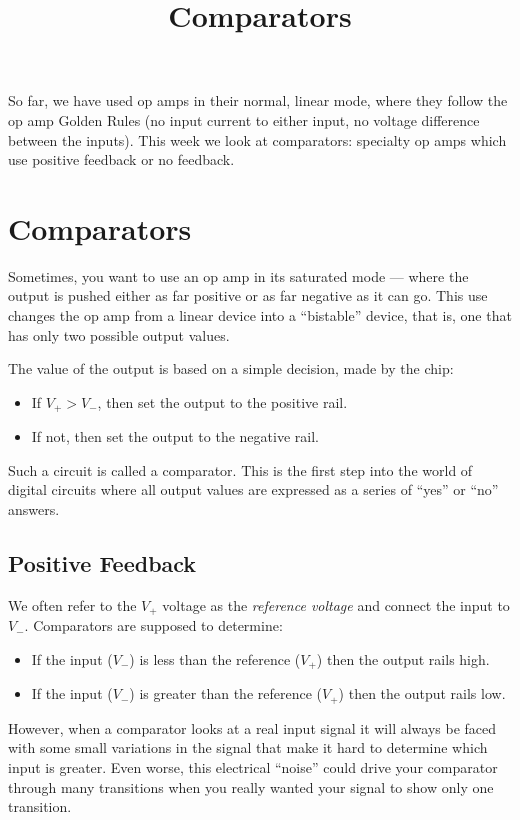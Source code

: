 \documentclass{article}
\title{Comparators}
\begin{document}
\maketitle

So far, we have used op amps in their normal, linear mode, where they follow the op amp Golden Rules (no input current to either input, no voltage difference between the inputs). This week we look at comparators: specialty op amps which use positive feedback or no feedback.

\section{Comparators}
Sometimes, you want to use an op amp in its saturated mode --- where the output is pushed either as far positive or as far negative as it can go. This use changes the op amp from a linear device into a ``bistable'' device, that is, one that has only two possible output values.

The value of the output is based on a simple decision, made by the chip:
\begin{itemize}
\item If $V_+ > V_-$, then set the output to the positive rail.
\item If not, then set the output to the negative rail.
\end{itemize}
Such a circuit is called a comparator. This is the first step into the world of digital circuits where all output values are expressed as a series of ``yes'' or ``no'' answers.

\subsection{Positive Feedback}
We often refer to the $V_+$ voltage as the \emph{reference voltage} and connect the input to $V_-$. Comparators are supposed to determine:
\begin{itemize}
\item If the input ($V_-$) is less than the reference ($V_+$) then the output rails high. 
\item If the input ($V_-$) is greater than the reference ($V_+$) then the output rails low. 
\end{itemize}

However, when a comparator looks at a real input signal it will always be faced with some small variations in the signal that make it hard to determine which input is greater. Even worse, this electrical ``noise'' could drive your comparator through many transitions when you really wanted your signal to show only one transition. 
\end{document}
